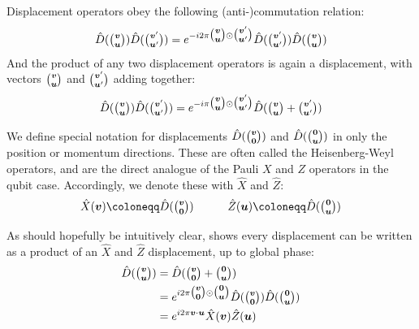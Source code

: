 Displacement operators obey the following (anti-)commutation relation:
\begin{equation}\label{eq:displacement_commutation}
    \hat{D}(\tbinom{\boldsymbol{v}}{\boldsymbol{u}}) \hat{D}(\tbinom{\boldsymbol{v}'}{\boldsymbol{u}'}) = e^{-i 2 \pi \tbinom{\boldsymbol{v}}{\boldsymbol{u}} \odot \tbinom{\boldsymbol{v}'}{\boldsymbol{u}'}} \hat{D}(\tbinom{\boldsymbol{v}'}{\boldsymbol{u}'}) \hat{D}(\tbinom{\boldsymbol{v}}{\boldsymbol{u}})
\end{equation}
And the product of any two displacement operators is again a displacement, with vectors $\tbinom{\boldsymbol{v}}{\boldsymbol{u}}$ and $\tbinom{\boldsymbol{v}'}{\boldsymbol{u}'}$ adding together:
\begin{equation}\label{eq:displacement_product_is_displacement}
    \hat{D}(\tbinom{\boldsymbol{v}}{\boldsymbol{u}}) \hat{D}(\tbinom{\boldsymbol{v}'}{\boldsymbol{u}'}) = e^{-i \pi \tbinom{\boldsymbol{v}}{\boldsymbol{u}} \odot \tbinom{\boldsymbol{v}'}{\boldsymbol{u}'}} \hat{D}(\tbinom{\boldsymbol{v}}{\boldsymbol{u}} + \tbinom{\boldsymbol{v}'}{\boldsymbol{u}'})
\end{equation}

We define special notation for displacements $\hat{D}(\tbinom{\boldsymbol{v}}{\boldsymbol{0}})$ and $\hat{D}(\tbinom{\boldsymbol{0}}{\boldsymbol{u}})$ in only the position or momentum directions.
These are often called the Heisenberg-Weyl operators, and are the direct analogue of the Pauli $X$ and $Z$ operators in the qubit case.
Accordingly, we denote these with $\hat{X}$ and $\hat{Z}$:
\begin{equation}
    \hat{X}(\bsym{v}) \coloneqq \hat{D}(\tbinom{\bsym{v}}{\bsym{0}})
    \qqquad
    \hat{Z}(\bsym{u}) \coloneqq \hat{D}(\tbinom{\bsym{0}}{\bsym{u}})
\end{equation}

As should hopefully be intuitively clear,  shows every displacement can be written as a product of an $\hat{X}$ and $\hat{Z}$ displacement, up to global phase:
\begin{equation}\label{eq:displacment_decomposed_xz}
    \begin{aligned}
        \hat{D}(\tbinom{\boldsymbol{v}}{\boldsymbol{u}})
        &= \hat{D}(\tbinom{\boldsymbol{v}}{\boldsymbol{0}} + \tbinom{\boldsymbol{0}}{\boldsymbol{u}}) \\
        &= e^{i 2 \pi \tbinom{\boldsymbol{v}}{\boldsymbol{0}} \odot \tbinom{\boldsymbol{0}}{\boldsymbol{u}}} \hat{D}(\tbinom{\boldsymbol{v}}{\boldsymbol{0}}) \hat{D}(\tbinom{\boldsymbol{0}}{\boldsymbol{u}}) \\
        &= e^{i 2 \pi \boldsymbol{v} \cdot \boldsymbol{u}} \hat{X}(\boldsymbol{v}) \hat{Z}(\boldsymbol{u})
    \end{aligned}
\end{equation}

